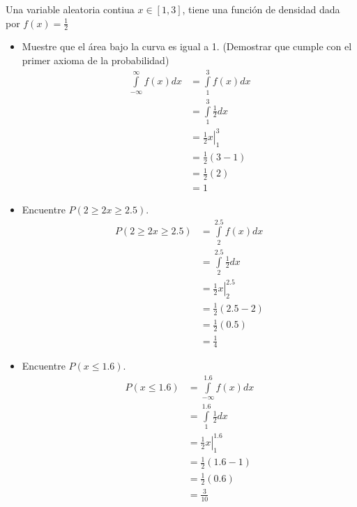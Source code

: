 \begin{ejemplo}
    Una variable aleatoria contiua $x\in [1,3]$, tiene una función de densidad dada por $f(x)=\frac{1}{2}$\begin{itemize}
        \item Muestre que el área bajo la curva es igual a 1. (Demostrar que cumple con el primer axioma de la probabilidad)
              \begin{align*}
                  \int\limits_{-\infty}^\infty f(x)dx & = \int\limits_{1}^3 f(x)dx        \\
                                                      & = \int\limits_{1}^3 \frac{1}{2}dx \\
                                                      & = \left.\frac{1}{2}x \right|_1^3  \\
                                                      & = \frac{1}{2}\left(3-1\right)     \\
                                                      & = \frac{1}{2}\left(2\right)       \\
                                                      & = 1
              \end{align*}
        \item Encuentre $P(2\geq 2 x \geq 2.5)$.
              \begin{align*}
                  P(2\geq 2 x \geq 2.5) & =\int\limits_2^2.5 f(x) dx         \\
                                        & =\int\limits_2^2.5 \frac{1}{2} dx  \\
                                        & = \left.\frac{1}{2}x \right|_2^2.5 \\
                                        & = \frac{1}{2}\left(2.5-2\right)    \\
                                        & = \frac{1}{2}\left(0.5\right)      \\
                                        & = \frac{1}{4}
              \end{align*}
        \item Encuentre $P(x\leq 1.6)$.
              \begin{align*}
                  P(x\leq 1.6) & =\int\limits_{-\infty}^{1.6} f(x) dx \\
                               & =\int\limits_1^{1.6} \frac{1}{2} dx  \\
                               & = \left.\frac{1}{2}x \right|_1^{1.6} \\
                               & = \frac{1}{2}\left(1.6-1\right)      \\
                               & = \frac{1}{2}\left(0.6\right)        \\
                               & = \frac{3}{10}
              \end{align*}
    \end{itemize}
\end{ejemplo}
